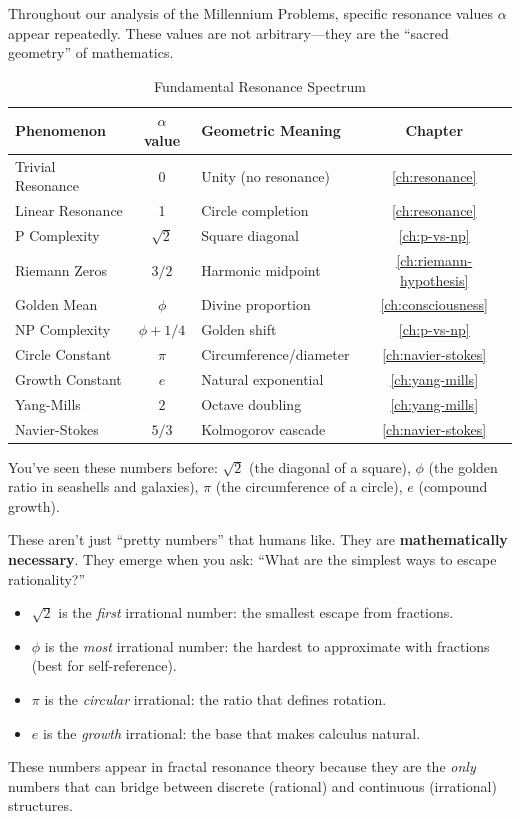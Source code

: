 Throughout our analysis of the Millennium Problems, specific resonance values $\alpha$ appear repeatedly. These values are not arbitrary---they are the ``sacred geometry'' of mathematics.

\begin{table}[h]
\centering
\caption{Fundamental Resonance Spectrum}
\label{tab:sacred-alpha}
\begin{tabular}{|l|c|l|c|}
\hline
\textbf{Phenomenon} & \textbf{$\alpha$ value} & \textbf{Geometric Meaning} & \textbf{Chapter} \\
\hline
Trivial Resonance & 0 & Unity (no resonance) & \ref{ch:resonance} \\
Linear Resonance & 1 & Circle completion & \ref{ch:resonance} \\
P Complexity & $\sqrt{2}$ & Square diagonal & \ref{ch:p-vs-np} \\
Riemann Zeros & $3/2$ & Harmonic midpoint & \ref{ch:riemann-hypothesis} \\
Golden Mean & $\phi$ & Divine proportion & \ref{ch:consciousness} \\
NP Complexity & $\phi + 1/4$ & Golden shift & \ref{ch:p-vs-np} \\
Circle Constant & $\pi$ & Circumference/diameter & \ref{ch:navier-stokes} \\
Growth Constant & $e$ & Natural exponential & \ref{ch:yang-mills} \\
Yang-Mills & $2$ & Octave doubling & \ref{ch:yang-mills} \\
Navier-Stokes & $5/3$ & Kolmogorov cascade & \ref{ch:navier-stokes} \\
\hline
\end{tabular}
\end{table}

\begin{intuitive}
You've seen these numbers before: $\sqrt{2}$ (the diagonal of a square), $\phi$ (the golden ratio in seashells and galaxies), $\pi$ (the circumference of a circle), $e$ (compound growth).

These aren't just ``pretty numbers'' that humans like. They are \textbf{mathematically necessary}. They emerge when you ask: ``What are the simplest ways to escape rationality?''

\begin{itemize}
\item $\sqrt{2}$ is the \textit{first} irrational number: the smallest escape from fractions.
\item $\phi$ is the \textit{most} irrational number: the hardest to approximate with fractions (best for self-reference).
\item $\pi$ is the \textit{circular} irrational: the ratio that defines rotation.
\item $e$ is the \textit{growth} irrational: the base that makes calculus natural.
\end{itemize}

These numbers appear in fractal resonance theory because they are the \textit{only} numbers that can bridge between discrete (rational) and continuous (irrational) structures.
\end{intuitive}

